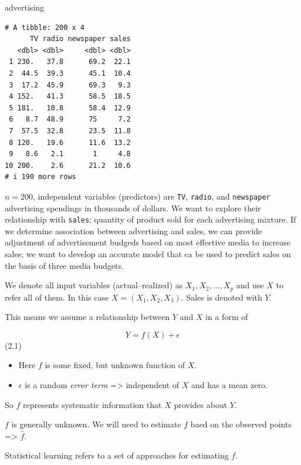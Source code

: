 \documentclass[
  letterpaper,
  DIV=11,
  numbers=noendperiod]{scrreprt}
\newenvironment{Shaded}{\begin{snugshade}}{\end{snugshade}}
\newcommand{\NormalTok}[1]{\textcolor[rgb]{0.33,0.33,0.33}{#1}}
\providecommand{\tightlist}{%
  \setlength{\itemsep}{0pt}\setlength{\parskip}{0pt}}\usepackage{longtable,booktabs,array}
\begin{document}
\begin{Shaded}
\begin{Highlighting}[]
\NormalTok{advertising}
\end{Highlighting}
\end{Shaded}

\begin{verbatim}
# A tibble: 200 x 4
      TV radio newspaper sales
   <dbl> <dbl>     <dbl> <dbl>
 1 230.   37.8      69.2  22.1
 2  44.5  39.3      45.1  10.4
 3  17.2  45.9      69.3   9.3
 4 152.   41.3      58.5  18.5
 5 181.   10.8      58.4  12.9
 6   8.7  48.9      75     7.2
 7  57.5  32.8      23.5  11.8
 8 120.   19.6      11.6  13.2
 9   8.6   2.1       1     4.8
10 200.    2.6      21.2  10.6
# i 190 more rows
\end{verbatim}

\(n=200\), independent variables (predictors) are \texttt{TV},
\texttt{radio}, and \texttt{newspaper} advertising spendings in
thousands of dollars. We want to explore their relationship with
\texttt{sales}; quantity of product sold for each advertising mixture.
If we determine association between advertising and sales, we can
provide adjustment of advertisement budgeds based on most effective
media to increase sales; we want to develop an accurate model that ca be
used to predict sales on the basis of three media budgets.

We denote all input variables (actual--realized) as
\(X_1, X_2, ..., X_p\) and use \(X\) to refer all of them. In this case
\(X = (X_1, X_2, X_3)\). Sales is denoted with \(Y\).

This means we assume a relationship between \(Y\) and \(X\) in a form of

\[
Y = f(X) + \epsilon
\] (2.1)

\begin{itemize}
\tightlist
\item
  Here \(f\) is some fixed, but unknown function of \(X\).
\item
  \(\epsilon\) is a random \emph{error term} =\textgreater{} independent
  of \(X\) and has a mean zero.
\end{itemize}

So \(f\) represents systematic information that \(X\) provides about
\(Y\).

\(f\) is generally unknown. We will need to estimate \(f\) baed on the
observed points =\textgreater{} \(\hat{f}\).

Statistical learning refers to a set of approaches for estimating \(f\).
\end{document}
